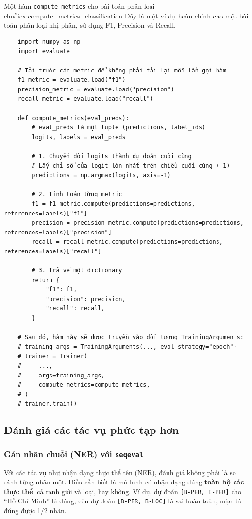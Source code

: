 \begin{example}{Một hàm \texttt{compute\_metrics} cho bài toán phân loại chuỗi}{ex:compute_metrics_classification}
    Đây là một ví dụ hoàn chỉnh cho một bài toán phân loại nhị phân, sử dụng F1, Precision và Recall.
    \begin{verbatim}
    import numpy as np
    import evaluate

    # Tải trước các metric để không phải tải lại mỗi lần gọi hàm
    f1_metric = evaluate.load("f1")
    precision_metric = evaluate.load("precision")
    recall_metric = evaluate.load("recall")

    def compute_metrics(eval_preds):
        # eval_preds là một tuple (predictions, label_ids)
        logits, labels = eval_preds
        
        # 1. Chuyển đổi logits thành dự đoán cuối cùng
        # Lấy chỉ số của logit lớn nhất trên chiều cuối cùng (-1)
        predictions = np.argmax(logits, axis=-1)
        
        # 2. Tính toán từng metric
        f1 = f1_metric.compute(predictions=predictions, references=labels)["f1"]
        precision = precision_metric.compute(predictions=predictions, references=labels)["precision"]
        recall = recall_metric.compute(predictions=predictions, references=labels)["recall"]
        
        # 3. Trả về một dictionary
        return {
            "f1": f1,
            "precision": precision,
            "recall": recall,
        }

    # Sau đó, hàm này sẽ được truyền vào đối tượng TrainingArguments:
    # training_args = TrainingArguments(..., eval_strategy="epoch")
    # trainer = Trainer(
    #     ...,
    #     args=training_args,
    #     compute_metrics=compute_metrics,
    # )
    # trainer.train()
    \end{verbatim}
\end{example}

\subsection{Đánh giá các tác vụ phức tạp hơn}
\label{ssec:complex_task_evaluation}

\subsubsection{Gán nhãn chuỗi (NER) với \texttt{seqeval}}
Với các tác vụ như nhận dạng thực thể tên (NER), đánh giá không phải là so sánh từng nhãn một. Điều cần biết là mô hình có nhận dạng đúng \textbf{toàn bộ các thực thể}, cả ranh giới và loại, hay không. Ví dụ, dự đoán \texttt{[B-PER, I-PER]} cho “Hồ Chí Minh” là đúng, còn dự đoán \texttt{[B-PER, B-LOC]} là sai hoàn toàn, mặc dù đúng được 1/2 nhãn.

